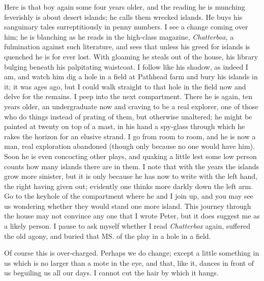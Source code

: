 Here is that boy again some four years older,
and the reading he is munching feverishly is about desert islands;
he calls them wrecked islands.
He buys his sanguinary tales surreptitiously in penny numbers.
I see a change coming over him;
he is blanching as he reads in the high‐class magazine, \emph{Chatterbox},
a fulmination against such literature,
and sees that unless his greed for islands is quenched he is for ever lost.
With gloaming he steals out of the house, his library bulging beneath his palpitating waistcoat.
I follow like his shadow, as indeed I am,
and watch him dig a hole in a field at Pathhead farm and bury his islands in it;
it was ages ago, but I could walk straight to that hole in the field now and delve for the remains.
I peep into the next compartment.
There he is again, ten years older,
an undergraduate now and craving to be a real explorer,
one of those who do things instead of prating of them,
but otherwise unaltered;
he might be painted at twenty on top of a mast,
in his hand a spy‐glass through which he rakes the horizon for an elusive strand.
I go from room to room,
and he is now a man, real exploration abandoned
(though only because no one would have him).
Soon he is even concocting other plays,
and quaking a little lest some low person counts how many islands there are in them.
I note that with the years the islands grow more sinister,
but it is only because he has now to write with the left hand, the right having given out;
evidently one thinks more darkly down the left arm.
Go to the keyhole of the compartment where he and I join up,
and you may see us wondering whether they would stand one more island.
This journey through the house may not convince any one that I wrote Peter,
but it does suggest me as a likely person.
I pause to ask myself whether I read \emph{Chatterbox} again, suffered the old agony,
and buried that MS. of the play in a hole in a field.

Of course this is over‐charged.
Perhaps we do change;
except a little something in us which is no larger than a mote in the eye,
and that, like it, dances in front of us beguiling us all our days.
I cannot cut the hair by which it hangs.

